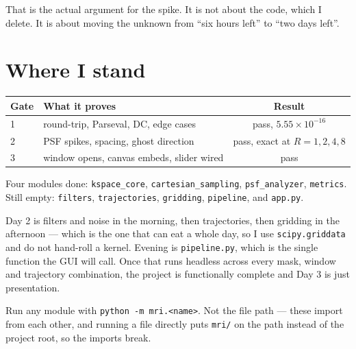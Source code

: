 \documentclass[11pt,a4paper]{article}
\begin{document}
That is the actual argument for the spike. It is not about the code, which I
delete. It is about moving the unknown from ``six hours left'' to ``two days
left''.

\section{Where I stand}

\begin{center}
\begin{tabular}{@{}llc@{}}
\toprule
\textbf{Gate} & \textbf{What it proves} & \textbf{Result} \\
\midrule
1 & round-trip, Parseval, DC, edge cases & pass, $5.55\times10^{-16}$ \\
2 & PSF spikes, spacing, ghost direction & pass, exact at $R=1,2,4,8$ \\
3 & window opens, canvas embeds, slider wired & pass \\
\bottomrule
\end{tabular}
\end{center}

Four modules done: \texttt{kspace\_core}, \texttt{cartesian\_sampling},
\texttt{psf\_analyzer}, \texttt{metrics}. Still empty:
\texttt{filters}, \texttt{trajectories}, \texttt{gridding}, \texttt{pipeline},
and \texttt{app.py}.

Day 2 is filters and noise in the morning, then trajectories, then gridding in
the afternoon --- which is the one that can eat a whole day, so I use
\texttt{scipy.griddata} and do not hand-roll a kernel. Evening is
\texttt{pipeline.py}, which is the single function the GUI will call. Once that
runs headless across every mask, window and trajectory combination, the project
is functionally complete and Day 3 is just presentation.

\vspace{6pt}
\noindent
Run any module with \texttt{python -m mri.<name>}. Not the file path --- these
import from each other, and running a file directly puts \texttt{mri/} on the
path instead of the project root, so the imports break.
\end{document}
